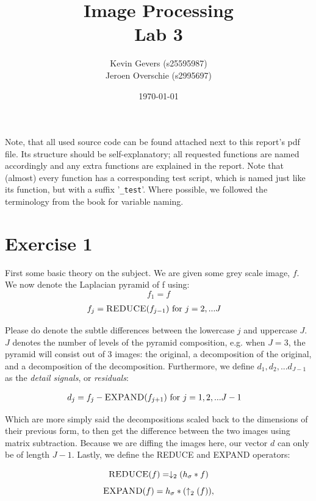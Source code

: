 \documentclass{article}
\title{Image Processing\\
    Lab 3}
\author{Kevin Gevers (s25595987) \\ Jeroen Overschie (s2995697)}
\date{\today}
\begin{document}
\maketitle

Note, that all used source code can be found attached next to this report's pdf file. Its structure should be self-explanatory; all requested functions are named accordingly and any extra functions are explained in the report. Note that (almost) every function has a corresponding test script, which is named just like its function, but with a suffix '\texttt{\_test}'. Where possible, we followed the terminology from the book \citep{gonzalez2008digital} for variable naming.

\section*{Exercise 1}
First some basic theory on the subject. We are given some grey scale image, $f$. We now denote the Laplacian pyramid of f using:
\[
    f_1 = f
\]
\[
\begin{aligned}
    f_j = \textsc{REDUCE}(f_{j-1}) & \text{  for $j=2,...J$}
\end{aligned}
\]

Please do denote the subtle differences between the lowercase $j$ and uppercase $J$. $J$ denotes the number of levels of the pyramid composition, e.g. when $J = 3$, the pyramid will consist out of 3 images: the original, a decomposition of the original, and a decomposition of the decomposition. Furthermore, we define $d_1,d_2,...d_{J-1}$ as the \textit{detail signals}, or \textit{residuals}:

\[
\begin{aligned}
    d_j = f_j - \textsc{EXPAND}(f_{j+1}) & \text{  for $j=1,2,...J-1$}
\end{aligned}
\]

Which are more simply said the decompositions scaled back to the dimensions of their previous form, to then get the difference between the two images using matrix subtraction. Because we are diffing the images here, our vector $d$ can only be of length $J-1$. Lastly, we define the \textsc{REDUCE} and \textsc{EXPAND} operators:

\[
    \textsc{REDUCE}(f) = \downarrow_2 (h_\sigma * f)
\]
\[
    \textsc{EXPAND}(f) = h_\sigma * (\uparrow_2 (f)),
\]
\end{document}
